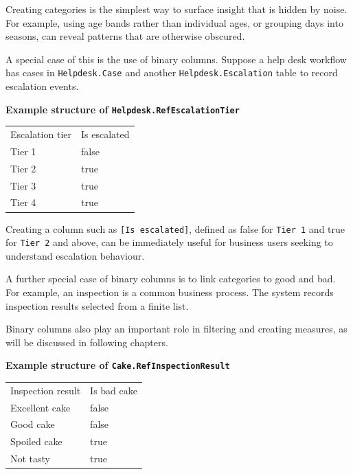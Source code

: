 \documentclass[10pt,openany,10pt]{book}
\newcounter{none}
\let\podeToprule\toprule
\let\podeMidrule\midrule
\let\podeBottomrule\bottomrule
\renewcommand{\toprule}{\arrayrulecolor{pbiGrid}\podeToprule}
\renewcommand{\midrule}{\arrayrulecolor{pbiGrid}\podeMidrule}
\renewcommand{\bottomrule}{\arrayrulecolor{pbiGrid}\podeBottomrule}
\begin{document}
Creating categories is the simplest way to surface insight that is
hidden by noise. For example, using age bands rather than individual
ages, or grouping days into seasons, can reveal patterns that are
otherwise obscured.

A special case of this is the use of binary columns. Suppose a help desk
workflow has cases in \texttt{Helpdesk.Case} and another
\texttt{Helpdesk.Escalation} table to record escalation events.

\textbf{Example structure of \texttt{Helpdesk.RefEscalationTier}}

{\def\LTcaptype{none} %
\begin{longtable}[]{@{}ll@{}}
\toprule\noalign{}
Escalation tier & Is escalated \\
\midrule\noalign{}
\endhead
\bottomrule\noalign{}
\endlastfoot
Tier 1 & false \\
Tier 2 & true \\
Tier 3 & true \\
Tier 4 & true \\
\end{longtable}
}

Creating a column such as \texttt{{[}Is\ escalated{]}}, defined as false
for \texttt{Tier\ 1} and true for \texttt{Tier\ 2} and above, can be
immediately useful for business users seeking to understand escalation
behaviour.

A further special case of binary columns is to link categories to good
and bad. For example, an inspection is a common business process. The
system records inspection results selected from a finite list.

Binary columns also play an important role in filtering and creating
measures, as will be discussed in following chapters.

\textbf{Example structure of \texttt{Cake.RefInspectionResult}}

{\def\LTcaptype{none} %
\begin{longtable}[]{@{}ll@{}}
\toprule\noalign{}
Inspection result & Is bad cake \\
\midrule\noalign{}
\endhead
\bottomrule\noalign{}
\endlastfoot
Excellent cake & false \\
Good cake & false \\
Spoiled cake & true \\
Not tasty & true \\
\end{longtable}
}
\end{document}

